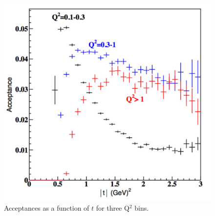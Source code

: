 \begin{figure}[htbp]
\begin{center}
\includegraphics[width=.65\textwidth]{jpsi_t_acceptance_3Q2.pdf}
\caption{Acceptances as a function of $t$ for three Q$^2$ bins.}
\label{fig:jp_acc}
\end{center}
\end{figure}




